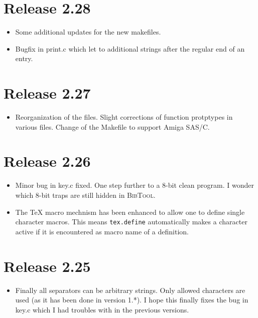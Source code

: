 \documentclass[11pt,a4paper]{scrartcl}
\newcommand\rsc[1]{\texttt{#1}}
\newcommand\File[1]{\textsf{#1}}
\newcommand\BibTool{\textsc{BibTool}}
\newenvironment{Release}[2]{\section*{Release #1}\begin{itemize}}{\end{itemize}}
\newenvironment{Fix}[1]{\item }{}
\newenvironment{Update}[1]{\item }{}
\begin{document}
 \begin{Release}{2.28}{}
  \begin{Update}{gene}
    Some additional updates for the new makefiles.
  \end{Update}
  \begin{Fix}{gene}
    Bugfix in \File{print.c} which let to additional strings after the
    regular end of an entry.
  \end{Fix}
 \end{Release}

 \begin{Release}{2.27}{}
  \begin{Update}{gene}
    Reorganization of the files. Slight corrections of function
    protptypes in various files. Change of the \File{Makefile} to
    support Amiga SAS/C.
  \end{Update}
 \end{Release}

 \begin{Release}{2.26}{}
  \begin{Fix}{gene}
    Minor bug in \File{key.c} fixed. One step further to a 8-bit clean
    program. I wonder which 8-bit traps are still hidden in \BibTool.
  \end{Fix}
  \begin{Update}{gene}
    The \TeX{} macro mechnism has been enhanced to allow one to define
    single character macros. This means \rsc{tex.define}
    automatically makes a character active if it is encountered as
    macro name of a definition.
  \end{Update}
 \end{Release}

 \begin{Release}{2.25}{}
  \begin{Update}{gene}
    Finally all separators can be arbitrary strings. Only allowed
    characters are used (as it has been done in version 1.*). I hope
    this finally fixes the bug in key.c which I had troubles with in
    the previous versions.
  \end{Update}
 \end{Release}
\end{document}
